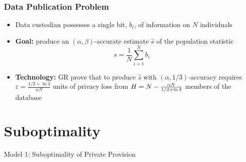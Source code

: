 \begin{frame}[allowframebreaks]%
\frametitle{Data Publication Problem}
\begin{itemize}
	\item Data custodian possesses a single bit, $b_{i}$, of information on $N$ individuals
	\item \textbf{Goal:} produce an $\left( \alpha,\beta \right) $-accurate estimate $\hat{s}$ of the population
statistic%
\begin{equation}
s=\frac{1}{N}\sum_{i=1}^{N}b_{i}  \label{eqn:s_def}
\end{equation}%
\item \textbf{Technology: } GR prove that
to produce $\hat{s}$ with $\left( \alpha ,1/3\right) $-accuracy requires $\varepsilon =\frac{1/2+\ln 3}{\alpha N}$ units of privacy loss from $H=N-\frac{\alpha N}{%
1/2+\ln 3}$ members of the database
\end{itemize}



\end{frame}%
%


\section[Suboptimality]{Suboptimality}

\begin{frame}[allowframebreaks]%

\begin{center}
	{\Large Model 1: Suboptimality of Private Provision}
\end{center}



\end{frame}%
%

